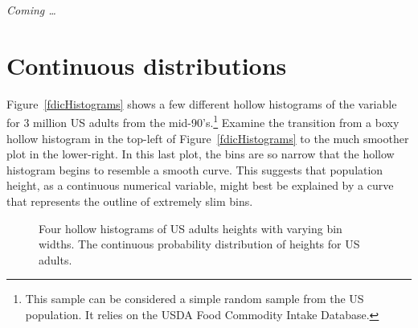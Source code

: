 \textit{Coming \ldots}


\section{Continuous distributions}
\label{contDist}


Figure~\ref{fdicHistograms} shows a few different hollow histograms of the variable  for 3 million US adults from the mid-90's.\footnote{This sample can be considered a simple random sample from the US population. It relies on the USDA Food Commodity Intake Database.} Examine the transition from a boxy hollow histogram in the top-left of Figure~\ref{fdicHistograms} to the much smoother plot in the lower-right. In this last plot, the bins are so narrow that the hollow histogram begins to resemble a smooth curve. This suggests that population height, as a continuous numerical variable, might best be explained by a curve that represents the outline of extremely slim bins.

\begin{figure}[h!]
	\centering
	\caption{ Four hollow histograms of US adults heights with varying bin widths.  The continuous probability distribution of heights for US adults.}
\end{figure}

